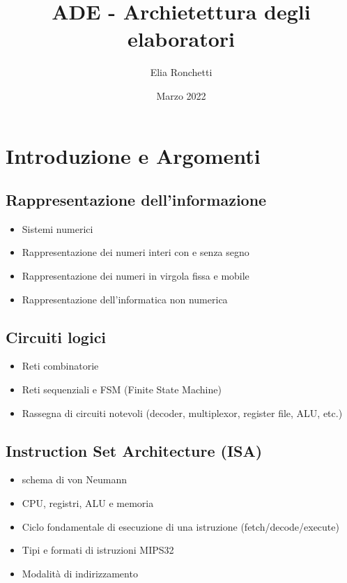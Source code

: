 \documentclass[12pt, a4paper, openany]{book}
\begin{document}
\title{ADE - Archietettura degli elaboratori}
\author{Elia Ronchetti}
\date{Marzo 2022}

\maketitle
\tableofcontents

\chapter{Introduzione e Argomenti}
\section{Rappresentazione dell'informazione}
\begin{itemize}
    \item Sistemi numerici
    \item Rappresentazione dei numeri interi con e senza segno
    \item Rappresentazione dei numeri in virgola fissa e mobile
    \item Rappresentazione dell'informatica non numerica
\end{itemize}

\section{Circuiti logici}
\begin{itemize}
    \item Reti combinatorie
    \item Reti sequenziali e FSM (Finite State Machine)
    \item Rassegna di circuiti notevoli (decoder, multiplexor, register file, ALU, etc.)
\end{itemize}

\section{Instruction Set Architecture (ISA)}
\begin{itemize}
    \item schema di von Neumann
    \item CPU, registri, ALU e memoria
    \item Ciclo fondamentale di esecuzione di una istruzione (fetch/decode/execute)
    \item Tipi e formati di istruzioni MIPS32
    \item Modalità di indirizzamento
\end{itemize}
\end{document}
